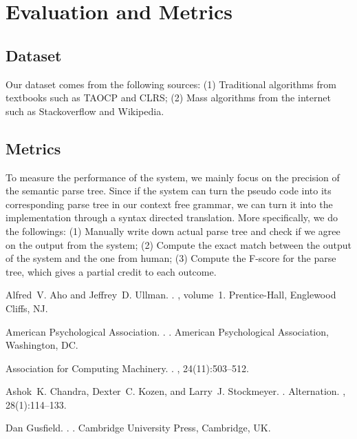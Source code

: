\documentclass[11pt]{article}
\begin{document}
\section{Evaluation and Metrics}

\subsection{Dataset}

Our dataset comes from the following sources: (1) Traditional algorithms 
from textbooks such as TAOCP and CLRS; (2) Mass algorithms from the internet
 such as Stackoverflow and Wikipedia.  

\subsection{Metrics}
To measure the performance of the system, we mainly focus on the precision of
the semantic parse tree. Since if the system can turn the pseudo code into 
its corresponding parse tree in our context free grammar,  we can turn it into 
the implementation through a syntax directed translation. More specifically,
we do the followings: (1) Manually write down actual parse tree and check if
we agree on the output from the system; (2)  Compute the exact match between
the output of the system and the one from human; (3) Compute the F-score for the
parse tree, which gives a partial credit to each outcome.


%
%

\begin{thebibliography}{}

Alfred~V. Aho and Jeffrey~D. Ullman.
.
, volume~1.
\newblock Prentice-{Hall}, Englewood Cliffs, NJ.

{American Psychological Association}.
.
.
\newblock American Psychological Association, Washington, DC.

{Association for Computing Machinery}.
.
, 24(11):503--512.

Ashok~K. Chandra, Dexter~C. Kozen, and Larry~J. Stockmeyer.
.
\newblock Alternation.
,
  28(1):114--133.

Dan Gusfield.
.
.
\newblock Cambridge University Press, Cambridge, UK.

\end{thebibliography}
\end{document}

